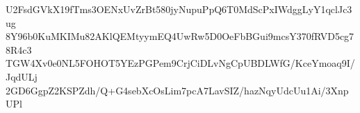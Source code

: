 U2FsdGVkX19fTms3OENxUvZrBt580jyNupuPpQ6T0MdScPxIWdggLyY1qclJc3ug
8Y96b0KuMKIMu82AKlQEMtyymEQ4UwRw5D0OeFbBGui9mcsY370fRVD5cg78R4c3
TGW4Xv0e0NL5FOHOT5YEzPGPem9CrjCiDLvNgCpUBDLWfG/KceYmoaq9I/JqdULj
2GD6GgpZ2KSPZdh/Q+G4sebXcOsLim7pcA7LavSIZ/hazNqyUdcUu1Ai/3XnpUPl
